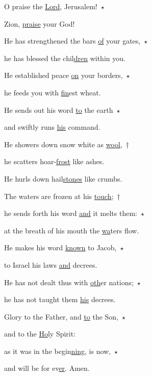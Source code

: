 \noindent O praise the \uline{Lord}, Jerusalem!~$\star$~\nopagebreak

Zion, \uline{praise} your God!

\noindent He has strengthened the bars \uline{of} your gates,~$\star$~\nopagebreak

he has blessed the chil\uline{dren} within you.

\noindent He established peace \uline{on} your borders,~$\star$~\nopagebreak

he feeds you with \uline{fin}est wheat.

\noindent He sends out his word \uline{to} the earth~$\star$~\nopagebreak

and swiftly runs \uline{his} command.

\noindent He showers down snow white as \uline{wool},~†~\nopagebreak

he scatters hoar-\uline{frost} like ashes.

He hurls down hail\uline{stones} like crumbs.

\noindent The waters are frozen at his \uline{touch};~†~\nopagebreak

he sends forth his word \uline{and} it melts them:~$\star$~\nopagebreak

at the breath of his mouth the \uline{wa}ters flow.

\noindent He makes his word \uline{known} to Jacob,~$\star$~\nopagebreak

to Israel his laws \uline{and} decrees.

\noindent He has not dealt thus with \uline{oth}er nations;~$\star$~\nopagebreak

he has not taught them \uline{his} decrees.

\noindent Glory to the Father, and \uline{to} the Son,~$\star$~\nopagebreak

and to the \uline{Ho}ly Spirit:

\noindent as it was in the begin\uline{ning}, is now,~$\star$~\nopagebreak

and will be for ev\uline{er}. Amen.

